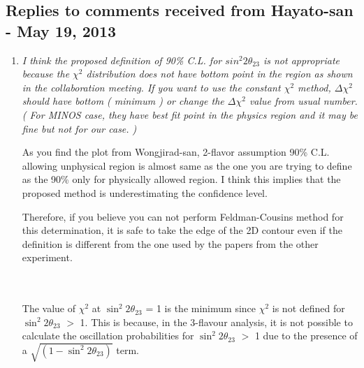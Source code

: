 \subsection{Replies to comments received from Hayato-san - May 19, 2013}


\begin{enumerate}
\vspace{5 mm}
\item
{\em
 I think the proposed definition of 90\% C.L. for $sin^2 2\theta_{23}$ is not appropriate
 because the $\chi^2$ distribution does not have bottom point in the region as shown in the collaboration meeting.
 If you want to use the constant $\chi^2$ method, $\Delta \chi^2$ should have bottom ( minimum ) 
 or change the $\Delta \chi^2$ value from usual number. 
 ( For MINOS case, they have best fit point in the physics region and it may be fine but not for our case. )

 As you find the plot from Wongjirad-san, 2-flavor assumption 90\% C.L. allowing unphysical region
 is almost same as the one you are trying to define as the 90\% only for physically allowed region.
 I think this implies that the proposed method is underestimating the confidence level.

 Therefore, if you believe you can not perform Feldman-Cousins method for this determination,
 it is safe to take the edge of the 2D contour even if the definition is different from the one used by the papers from the other experiment.
}\\
\\
The value of $\chi^{2}$ at  $\sin^{2} 2 \theta_{23}$ = 1 is the minimum since $\chi^{2}$ is not defined for 
$\sin^{2} 2 \theta_{23}$ $>$ 1. This is because, in the 3-flavour analysis, it is not possible to calculate the 
oscillation probabilities for $\sin^{2} 2 \theta_{23}$ $>$ 1 due to the presence of a $\sqrt{(1 - \sin^{2} 2 \theta_{23})}$ term. 


\end{enumerate}
